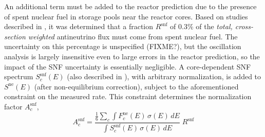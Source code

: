 \documentclass[../thesis.tex]{subfiles}
\begin{document}
An additional term must be added to the reactor prediction due to the presence of spent nuclear fuel in storage pools near the reactor cores. Based on studies described in \cite{Lewis}, it was determined that a fraction $R^\mathrm{snf}$ of 0.3\% of the \emph{total, cross-section weighted} antineutrino flux must come from spent nuclear fuel. The uncertainty on this percentage is unspecified (FIXME?), but the oscillation analysis is largely insensitive even to large errors in the reactor prediction, so the impact of the SNF uncertainty is essentially negligible. A core-dependent SNF spectrum $S^\mathrm{snf}_c(E)$ (also described in \cite{Lewis}), with arbitrary normalization, is added to $S^\mathrm{ne}(E)$ (after non-equilibrium correction), subject to the aforementioned constraint on the measured rate. This constraint determines the normalization factor $A^\mathrm{snf}_c$,
\[ A^\mathrm{snf}_c =  \frac{\frac{1}{6}\sum_c \int F^\mathrm{ne}_c(E)\,\sigma(E)\, dE}{\int S^\mathrm{snf}_c(E)\,\sigma(E)\, dE} \; R^\mathrm{snf}
\]
\end{document}
